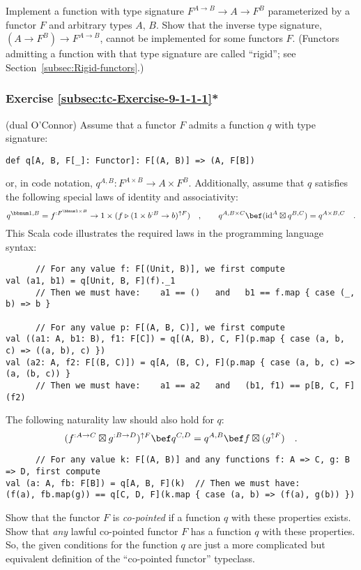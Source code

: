 Implement a function with type signature $F^{A\rightarrow B}\rightarrow A\rightarrow F^{B}$
parameterized by a functor $F$ and arbitrary types $A$, $B$. Show
that the inverse type signature, $(A\rightarrow F^{B})\rightarrow F^{A\rightarrow B}$,
cannot be implemented for some functors $F$. (Functors admitting
a function with that type signature are called \textsf{``}rigid\textsf{''}; see Section~\ref{subsec:Rigid-functors}.)

\subsubsection{Exercise \label{subsec:tc-Exercise-9-1-1-1}\ref{subsec:tc-Exercise-9-1-1-1}{*}}

(dual O\textsf{'}Connor) Assume that a functor $F$
admits a function $q$ with type signature:
\begin{lstlisting}
def q[A, B, F[_]: Functor]: F[(A, B)] => (A, F[B])
\end{lstlisting}
or, in code notation, $q^{A,B}:F^{A\times B}\rightarrow A\times F^{B}$.
Additionally, assume that $q$ satisfies the following special laws
of identity and associativity:
\[
q^{\bbnum 1,B}=f^{:F^{\bbnum 1\times B}}\rightarrow1\times(f\triangleright(1\times b^{:B}\rightarrow b)^{\uparrow F})\quad,\quad\quad q^{A,B\times C}\bef(\text{id}^{A}\boxtimes q^{B,C})=q^{A\times B,C}\quad.
\]
This Scala code illustrates the required laws in the programming language
syntax:
\begin{lstlisting}
      // For any value f: F[(Unit, B)], we first compute
val (a1, b1) = q[Unit, B, F](f)._1
      // Then we must have:    a1 == ()   and   b1 == f.map { case (_, b) => b }

      // For any value p: F[(A, B, C)], we first compute
val ((a1: A, b1: B), f1: F[C]) = q[(A, B), C, F](p.map { case (a, b, c) => ((a, b), c) })
val (a2: A, f2: F[(B, C)]) = q[A, (B, C), F](p.map { case (a, b, c) => (a, (b, c)) }
      // Then we must have:    a1 == a2   and   (b1, f1) == p[B, C, F](f2)
\end{lstlisting}
The following naturality law should also hold for $q$:
\[
(f^{:A\rightarrow C}\boxtimes g^{:B\rightarrow D})^{\uparrow F}\bef q^{C,D}=q^{A,B}\bef f\boxtimes(g^{\uparrow F})\quad.
\]
\begin{lstlisting}
      // For any value k: F[(A, B)] and any functions f: A => C, g: B => D, first compute
val (a: A, fb: F[B]) = q[A, B, F](k)  // Then we must have:
(f(a), fb.map(g)) == q[C, D, F](k.map { case (a, b) => (f(a), g(b)) })
\end{lstlisting}
Show that the functor $F$ is \emph{co-pointed} if a function $q$
with these properties exists. Show that \emph{any} lawful co-pointed
functor $F$ has a function $q$ with these properties. So, the given
conditions for the function $q$ are just a more complicated but equivalent
definition of the \textsf{``}co-pointed functor\textsf{''} typeclass.

